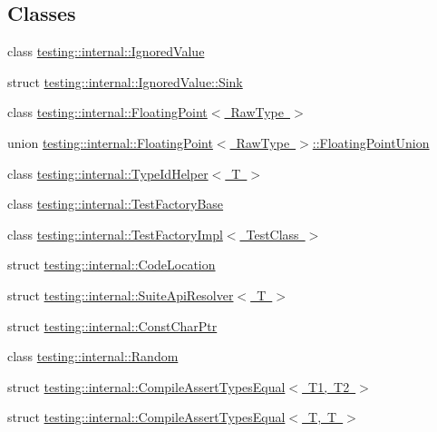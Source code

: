 \subsection*{Classes}
\begin{DoxyCompactItemize}
\item 
class \mbox{\hyperlink{classtesting_1_1internal_1_1_ignored_value}{testing\+::internal\+::\+Ignored\+Value}}
\item 
struct \mbox{\hyperlink{structtesting_1_1internal_1_1_ignored_value_1_1_sink}{testing\+::internal\+::\+Ignored\+Value\+::\+Sink}}
\item 
class \mbox{\hyperlink{classtesting_1_1internal_1_1_floating_point}{testing\+::internal\+::\+Floating\+Point$<$ Raw\+Type $>$}}
\item 
union \mbox{\hyperlink{uniontesting_1_1internal_1_1_floating_point_1_1_floating_point_union}{testing\+::internal\+::\+Floating\+Point$<$ Raw\+Type $>$\+::\+Floating\+Point\+Union}}
\item 
class \mbox{\hyperlink{classtesting_1_1internal_1_1_type_id_helper}{testing\+::internal\+::\+Type\+Id\+Helper$<$ T $>$}}
\item 
class \mbox{\hyperlink{classtesting_1_1internal_1_1_test_factory_base}{testing\+::internal\+::\+Test\+Factory\+Base}}
\item 
class \mbox{\hyperlink{classtesting_1_1internal_1_1_test_factory_impl}{testing\+::internal\+::\+Test\+Factory\+Impl$<$ Test\+Class $>$}}
\item 
struct \mbox{\hyperlink{structtesting_1_1internal_1_1_code_location}{testing\+::internal\+::\+Code\+Location}}
\item 
struct \mbox{\hyperlink{structtesting_1_1internal_1_1_suite_api_resolver}{testing\+::internal\+::\+Suite\+Api\+Resolver$<$ T $>$}}
\item 
struct \mbox{\hyperlink{structtesting_1_1internal_1_1_const_char_ptr}{testing\+::internal\+::\+Const\+Char\+Ptr}}
\item 
class \mbox{\hyperlink{classtesting_1_1internal_1_1_random}{testing\+::internal\+::\+Random}}
\item 
struct \mbox{\hyperlink{structtesting_1_1internal_1_1_compile_assert_types_equal}{testing\+::internal\+::\+Compile\+Assert\+Types\+Equal$<$ T1, T2 $>$}}
\item 
struct \mbox{\hyperlink{structtesting_1_1internal_1_1_compile_assert_types_equal_3_01_t_00_01_t_01_4}{testing\+::internal\+::\+Compile\+Assert\+Types\+Equal$<$ T, T $>$}}
\item 

\end{DoxyCompactItemize}
